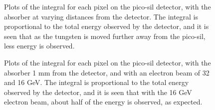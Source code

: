 \documentclass[twocolumn,aps,prd,reprint]{revtex4-1}
\begin{document}
\begin{figure}[!htbp]
\caption{Plots of the integral for each pixel on the pico-sil detector, with the absorber at varying distances from the detector. The integral is proportional to the total energy observed by the detector, and it is seen that as the tungsten is moved further away from the pico-sil, less energy is observed.}
\label{integral tungsten distance}
\end{figure}

\begin{figure}[!htbp]
\caption{Plots of the integral for each pixel on the pico-sil detector, with the absorber 1 mm from the detector, and with an electron beam of 32 and 16 GeV. The integral is proportional to the total energy observed by the detector, and it is seen that with the 16 GeV electron beam, about half of the energy is observed, as expected.}
\label{integral tungsten energy}
\end{figure}
\end{document}
